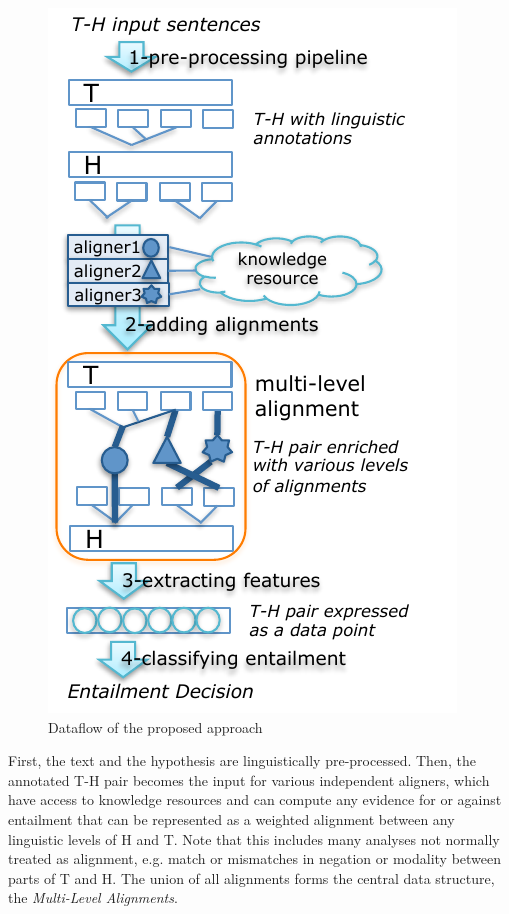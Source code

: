 \documentclass[11pt,letterpaper]{article}
\begin{document}
\begin{figure}[t!b]
  \centering
  \includegraphics[width=0.9\columnwidth]{figures/figure1.pdf}
  \caption{Dataflow of the proposed approach}
  \label{fig:1}
\end{figure}

First, the text and the hypothesis are linguistically
pre-processed. Then, the annotated T-H pair becomes the input for
various independent aligners, which have access to knowledge resources
and can compute any evidence for or against entailment that can be
represented as a weighted alignment between any linguistic levels of H
and T.
Note that this includes many analyses not normally treated as
alignment, e.g. match or mismatches in negation or modality between
parts of T and H. %
The union of all alignments forms the 
central data structure, the {\em Multi-Level Alignments}.
\end{document}
